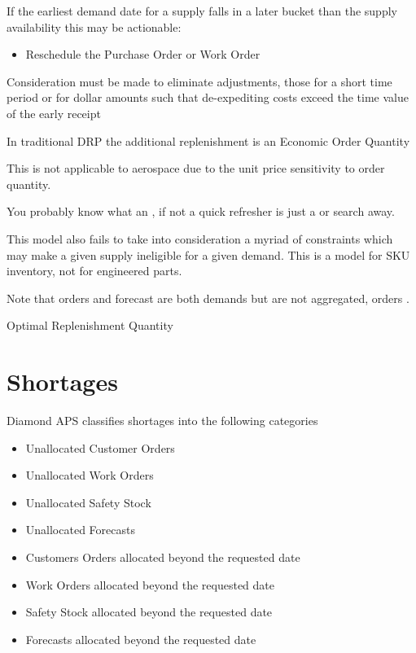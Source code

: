 \documentclass[letterpaper,10pt,english]{sphinxmanual}
\begin{document}
If the earliest demand date for a supply falls in a later bucket than the supply availability this may be actionable:
\begin{itemize}
\item {} 
Reschedule the Purchase Order or Work Order

\end{itemize}

Consideration must be made to eliminate  adjustments, those for a short time period or for dollar amounts
such that de-expediting costs exceed the time value of the early receipt

In traditional DRP the additional replenishment is an Economic Order Quantity 

This is not applicable to aerospace due to the unit price sensitivity to order quantity.

You probably know what an , if not a quick refresher is just a  or  search away.

This model also fails to take into consideration a myriad of constraints which may
make a given supply ineligible for a given demand.  This is a model for SKU inventory,
not for engineered parts.

Note that orders and forecast are both demands but are not aggregated, orders .

Optimal Replenishment Quantity


\section{Shortages}
\label{\detokenize{index:shortages}}
Diamond APS classifies shortages into the following categories
\begin{itemize}
\item {} 
Unallocated Customer Orders

\item {} 
Unallocated Work Orders

\item {} 
Unallocated Safety Stock

\item {} 
Unallocated Forecasts

\item {} 
Customers Orders allocated beyond the requested date

\item {} 
Work Orders allocated beyond the requested date

\item {} 
Safety Stock allocated beyond the requested date

\item {} 
Forecasts allocated beyond the requested date

\end{itemize}
\end{document}
